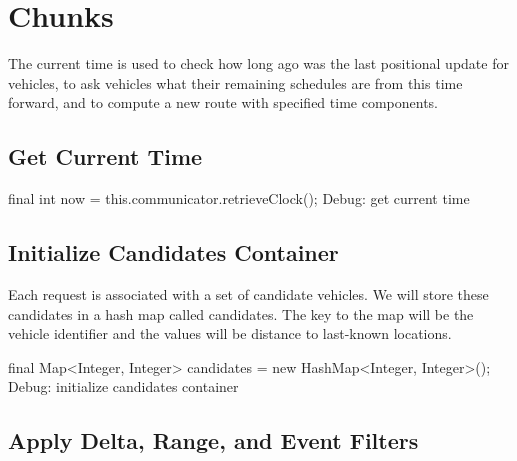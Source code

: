 \section{Chunks}
\label{NearestNeighbor: chunks}

The current time is used to check how long ago was the last positional update
for vehicles, to ask vehicles what their remaining schedules are from this time
forward, and to compute a new route with specified time components.

\subsection{Get Current Time}

\nwenddocs{}\endmoddef\nwstartdeflinemarkup{}\nwenddeflinemarkup
final int now = this.communicator.retrieveClock();
\LA{}Debug: get current time~{\nwtagstyle{}}\RA{}
\nwendcode{}\nwdocspar

\subsection{Initialize Candidates Container}

Each request is associated with a set of candidate vehicles. We will store
these candidates in a hash map called {\Tt{}candidates\nwendquote}. The key to the map will
be the vehicle identifier and the values will be distance to last-known
locations.

\nwenddocs{}\endmoddef\nwstartdeflinemarkup{}\nwenddeflinemarkup
final Map<Integer, Integer> candidates = new HashMap<Integer, Integer>();
\LA{}Debug: initialize candidates container~{\nwtagstyle{}}\RA{}
\nwendcode{}\nwdocspar

\subsection{Apply Delta, Range, and Event Filters}

